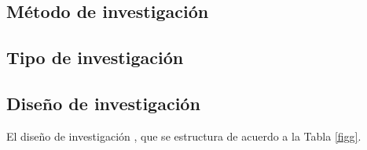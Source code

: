 \documentclass[12pt,a4paper]{article}
\begin{document}
\subsection{Método de investigación}


\subsection{Tipo de investigación}
%

%


\subsection{Diseño de investigación}
El diseño de investigación \MakeTextLowercase{\diseno}, que se estructura de acuerdo a la Tabla \ref{figg}.
\end{document}
